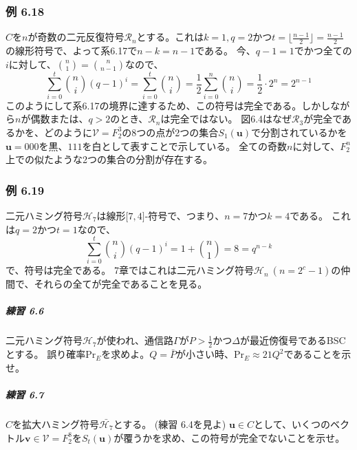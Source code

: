 \documentclass[12pt,a4paper]{article}
\begin{document}
    \subsubsection*{例 6.18}

      $C$を$n$が奇数の二元反復符号$\mathcal{R}_n$とする。これは$k = 1, q = 2$かつ$t = \lfloor \frac{n - 1}{2} \rfloor = \frac{n - 1}{2}$の線形符号で、よって系6.17で$n - k = n - 1$である。
      今、$q - 1 = 1$でかつ全ての$i$に対して、$\binom{n}{1} = \binom{n}{n - 1}$なので、
      \[ \sum_{i = 0}^t \binom{n}{i} {(q - 1)}^i = \sum_{i = 0}^t \binom{n}{i} = \frac{1}{2} \sum_{i = 0}^n \binom{n}{i} = \frac{1}{2} \cdot 2^n = 2^{n-1} \]
      このようにして系6.17の境界に達するため、この符号は完全である。しかしながら$n$が偶数または、$q > 2$のとき、$\mathcal{R}_n$は完全ではない。
      図6.4はなぜ$\mathcal{R}_3$が完全であるかを、どのように$\mathcal{V} = F_2^3$の8つの点が2つの集合$S_1(\mathbf{u})$で分割されているかを$\mathbf{u} = 000$を黒、$111$を白として表すことで示している。
      全ての奇数$n$に対して、$F_2^n$上での似たような2つの集合の分割が存在する。

    \subsubsection*{例 6.19}
      
      二元ハミング符号$\mathcal{H}_7$は線形$\lbrack 7, 4 \rbrack$-符号で、つまり、$n = 7$かつ$k = 4$である。
      これは$q = 2$かつ$t = 1$なので、
      \[ \sum_{i = 0}^t \binom{n}{i} {(q - 1)}^i = 1 + \binom{n}{1} = 8 = q^{n-k}\]
      で、符号は完全である。
      7章ではこれは二元ハミング符号$\mathcal{H}_n \ (n = 2^c - 1)$の仲間で、それらの全てが完全であることを見る。

      \subparagraph{練習 6.6}
        
        二元ハミング符号$\mathcal{H}_7$が使われ、通信路$\Gamma$が$P > \frac{1}{2}$かつ$\Delta$が最近傍復号であるBSCとする。
        誤り確率$\text{Pr}_E$を求めよ。$Q = \bar{P}$が小さい時、$\text{Pr}_E \approx 21Q^2$であることを示せ。

      \subparagraph{練習 6.7}
        
        $C$を拡大ハミング符号$\bar{\mathcal{H}_7}$とする。 (練習 6.4を見よ)
        $\mathbf{u} \in C$として、いくつのベクトル$\mathbf{v} \in \mathcal{V} = F_2^8$を$S_t(\mathbf{u})$が覆うかを求め、この符号が完全でないことを示せ。
\end{document}
